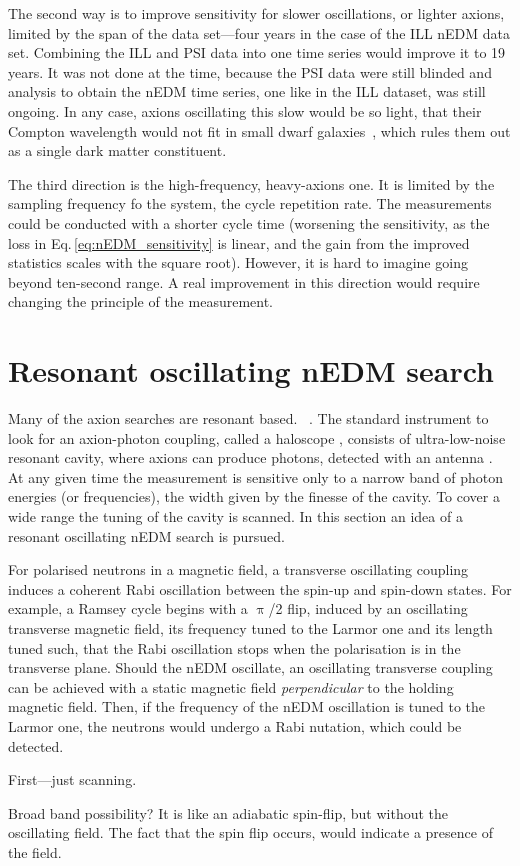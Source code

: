 The second way is to improve sensitivity for slower oscillations, or lighter axions, limited by the span of the data set---four years in the case of the ILL nEDM data set. Combining the ILL and PSI data into one time series would improve it to 19 years. It was not done at the time, because the PSI data were still blinded and analysis to obtain the nEDM time series, one like in the ILL dataset, was still ongoing. In any case, axions oscillating this slow would be so light, that their Compton wavelength would not fit in small dwarf galaxies~\cite{Marsh2015Review}, which rules them out as a single dark matter constituent.

The third direction is the high-frequency, heavy-axions one. It is limited by the sampling frequency fo the system, the cycle repetition rate. The measurements could be conducted with a shorter cycle time (worsening the sensitivity, as the loss in Eq.\,\ref{eq:nEDM_sensitivity} is linear, and the gain from the improved statistics scales with the square root).
However, it is hard to imagine going beyond ten-second range. A real improvement in this direction would require changing the principle of the measurement.




\section{Resonant oscillating nEDM search}
Many of the axion searches are resonant based.~\cite{PhysRevLett.104.041301,CASPEr2014} .
The standard instrument to look for an axion-photon coupling, called a haloscope , consists of ultra-low-noise resonant cavity, where axions can produce photons, detected with an antenna .
At any given time the measurement is sensitive only to a narrow band of photon energies (or frequencies), the width given by the finesse  of the cavity. To cover a wide range the tuning of the cavity is scanned. In this section an idea of a resonant oscillating nEDM search is pursued.

For polarised neutrons in a magnetic field, a transverse oscillating coupling induces a coherent Rabi oscillation between the spin-up and spin-down states.
For example, a Ramsey cycle begins with a $\uppi$/2 flip, induced by an oscillating transverse magnetic field, its frequency tuned to the Larmor one and its length tuned such, that the Rabi oscillation stops when the polarisation is in the transverse plane. Should the nEDM oscillate, an oscillating transverse coupling can be achieved with a static magnetic field \emph{perpendicular} to the holding magnetic field. Then, if the frequency of the nEDM oscillation is tuned to the Larmor one, the neutrons would undergo a Rabi nutation, which could be detected.



First---just scanning.

Broad band possibility? It is like an adiabatic spin-flip, but without the oscillating field. The fact that the spin flip occurs, would indicate a presence of the field.

